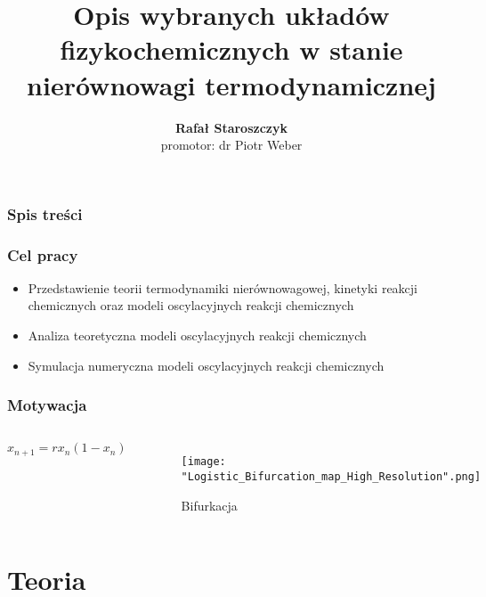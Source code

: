 \documentclass{beamer}
\title{Opis wybranych układów fizykochemicznych w stanie nierównowagi termodynamicznej}
\author{\textbf{Rafał Staroszczyk}\\\footnotesize promotor: dr Piotr Weber}
\institute{Wydział Fizyki Technicznej i Matematyki Stosowanej \\
Politechnika Gdańska}
\date{}
\begin{document}
\beamertemplatenavigationsymbolsempty
{}

\begin{frame}
\titlepage
\end{frame}

\begin{frame}
\frametitle{Spis treści}
\tableofcontents
\end{frame}

\begin{frame}
\frametitle{Cel pracy}
\begin{itemize}
\item Przedstawienie teorii termodynamiki nierównowagowej, kinetyki reakcji chemicznych oraz modeli oscylacyjnych reakcji chemicznych
\item Analiza teoretyczna modeli oscylacyjnych reakcji chemicznych
\item Symulacja numeryczna modeli oscylacyjnych reakcji chemicznych
\end{itemize}
\end{frame}

\begin{frame}
\frametitle{Motywacja}
\begin{columns}
\begin{equation*}
x_{n+1}=rx_{n}\left(1-x_{n}\right)
\end{equation*}
\begin{figure}
\texttt{[image: "Logistic\_Bifurcation\_map\_High\_Resolution".png]}
\caption{Bifurkacja}
\end{figure}
\begin{figure}
 \\
\end{figure}
\end{columns}
\end{frame}

\section{Teoria}
\end{document}
